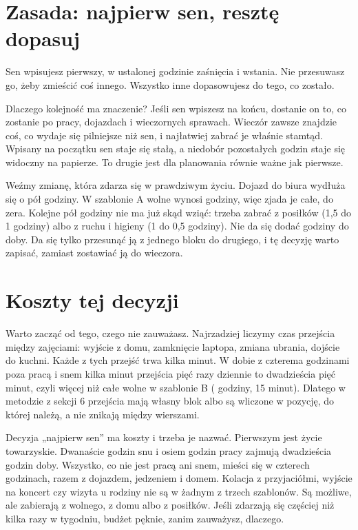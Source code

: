 \section{Zasada: najpierw sen, resztę dopasuj}

\begin{zasada}
Sen wpisujesz pierwszy, w ustalonej godzinie zaśnięcia i wstania. Nie przesuwasz go, żeby zmieścić coś innego. Wszystko inne dopasowujesz do tego, co zostało.
\end{zasada}

Dlaczego kolejność ma znaczenie? Jeśli sen wpiszesz na końcu, dostanie on to, co zostanie po pracy, dojazdach i wieczornych sprawach. Wieczór zawsze znajdzie coś, co wydaje się pilniejsze niż sen, i najłatwiej zabrać je właśnie stamtąd. Wpisany na początku sen staje się stałą, a niedobór pozostałych godzin staje się widoczny na papierze. To drugie jest dla planowania równie ważne jak pierwsze.

Weźmy zmianę, która zdarza się w prawdziwym życiu. Dojazd do biura wydłuża się o pół godziny. W szablonie A wolne wynosi  godziny, więc zjada je całe, do zera. Kolejne pół godziny nie ma już skąd wziąć: trzeba zabrać z posiłków (1,5 do 1 godziny) albo z ruchu i higieny (1 do 0,5 godziny). Nie da się dodać godziny do doby. Da się tylko przesunąć ją z jednego bloku do drugiego, i tę decyzję warto zapisać, zamiast zostawiać ją do wieczora.

\section{Koszty tej decyzji}

Warto zacząć od tego, czego nie zauważasz. Najrzadziej liczymy czas przejścia między zajęciami: wyjście z domu, zamknięcie laptopa, zmiana ubrania, dojście do kuchni. Każde z tych przejść trwa kilka minut. W dobie z czterema godzinami poza pracą i snem kilka minut przejścia pięć razy dziennie to dwadzieścia pięć minut, czyli więcej niż całe wolne w szablonie B ( godziny, 15 minut). Dlatego w metodzie z sekcji 6 przejścia mają własny blok albo są wliczone w pozycję, do której należą, a nie znikają między wierszami.

Decyzja „najpierw sen” ma koszty i trzeba je nazwać. Pierwszym jest życie towarzyskie. Dwanaście godzin snu i osiem godzin pracy zajmują dwadzieścia godzin doby. Wszystko, co nie jest pracą ani snem, mieści się w czterech godzinach, razem z dojazdem, jedzeniem i domem. Kolacja z przyjaciółmi, wyjście na koncert czy wizyta u rodziny nie są w żadnym z trzech szablonów. Są możliwe, ale zabierają z wolnego, z domu albo z posiłków. Jeśli zdarzają się częściej niż kilka razy w tygodniu, budżet pęknie, zanim zauważysz, dlaczego.

